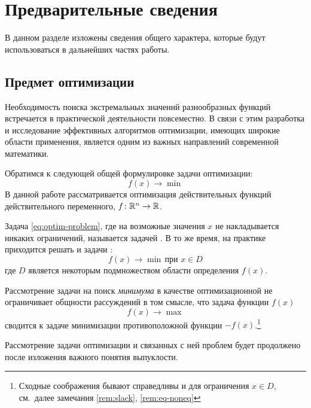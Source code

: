 \section{Предварительные сведения}
В данном разделе изложены сведения общего характера, которые будут
использоваться в дальнейших частях работы.

\subsection{Предмет оптимизации}

Необходимость поиска экстремальных значений разнообразных функций
встречается в практической деятельности повсеместно. В связи с этим
разработка и исследование эффективных алгоритмов оптимизации, имеющих
широкие области применения, является одним из важных направлений
современной математики.

Обратимся к следующей общей формулировке задачи оптимизации:
\begin{equation}
  \label{eq:optim-problem}
  f(x) \to \min
\end{equation}
В данной работе рассматривается оптимизация действительных функций
действительного переменного, $f\colon \mathbb{R}^n \to \mathbb{R}$.

Задача \eqref{eq:optim-problem}, где на возможные значения $x$ не
накладывается никаких ограничений, называется задачей
. В то же время, на практике
приходится решать и задачи :
\begin{equation}
  \label{eq:optim-problem-c}
  f(x) \to \min\, \text{при } x \in D
\end{equation}
где $D$ является некоторым подмножеством области определения $f(x)$.

\begin{rem}
  Рассмотрение задачи на поиск \emph{минимума} в качестве
  оптимизационной не ограничивает общности рассуждений в том смысле,
  что задача  функции $f(x)$
  \begin{equation*}
    f(x) \to \max
  \end{equation*}
  сводится к задаче минимизации противоположной функции
  $-f(x)$.\footnote{Сходные соображения бывают справедливы и для
    ограничения \mbox{$x \in D$}, см. далее замечания \ref{rem:slack},
    \ref{rem:eq-noneq}}
\end{rem}

Рассмотрение задачи оптимизации и связанных с ней проблем будет
продолжено после изложения важного понятия выпуклости.



